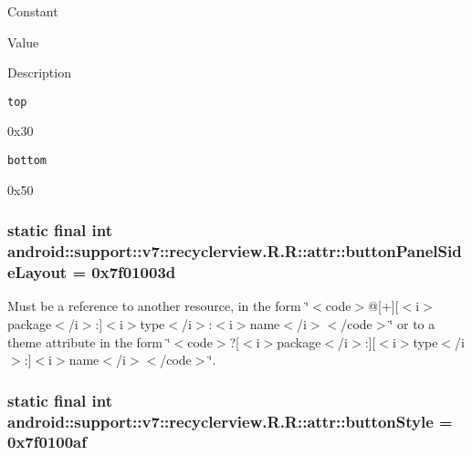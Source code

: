 Constant

Value

Description 

{\tt top}

0x30

{\tt bottom}

0x50\hypertarget{classandroid_1_1support_1_1v7_1_1recyclerview_1_1_r_1_1attr_d507a4d2ea511507ea8dbe10f603bdcb}{
\subsubsection[{buttonPanelSideLayout}]{\setlength{\rightskip}{0pt plus 5cm}static final int android::support::v7::recyclerview.R.R::attr::buttonPanelSideLayout = 0x7f01003d}}
\label{classandroid_1_1support_1_1v7_1_1recyclerview_1_1_r_1_1attr_d507a4d2ea511507ea8dbe10f603bdcb}


Must be a reference to another resource, in the form \char`\"{}$<$code$>$@\mbox{[}+\mbox{]}\mbox{[}$<$i$>$package$<$/i$>$:\mbox{]}$<$i$>$type$<$/i$>$:$<$i$>$name$<$/i$>$$<$/code$>$\char`\"{} or to a theme attribute in the form \char`\"{}$<$code$>$?\mbox{[}$<$i$>$package$<$/i$>$:\mbox{]}\mbox{[}$<$i$>$type$<$/i$>$:\mbox{]}$<$i$>$name$<$/i$>$$<$/code$>$\char`\"{}. \hypertarget{classandroid_1_1support_1_1v7_1_1recyclerview_1_1_r_1_1attr_db7a4b3349200950967057532627746c}{
\subsubsection[{buttonStyle}]{\setlength{\rightskip}{0pt plus 5cm}static final int android::support::v7::recyclerview.R.R::attr::buttonStyle = 0x7f0100af}}
\label{classandroid_1_1support_1_1v7_1_1recyclerview_1_1_r_1_1attr_db7a4b3349200950967057532627746c}


